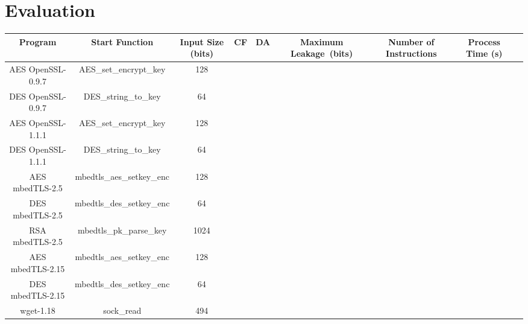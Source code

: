 \section{Evaluation}

\begin{table*}[h]
    \begin{tabular}{c c c c c c c c l}
    \hline
    Program                & Start Function             & Input Size (bits)   & CF   & DA     & Maximum Leakage (bits)& Number of Instructions & Process Time (s) \\ \hline
    AES OpenSSL-0.9.7      & AES\_set\_encrypt\_key     &     128             &      &        &                       &                        &                  \\
    DES OpenSSL-0.9.7      & DES\_string\_to\_key       &     64              &      &        &                       &                        &                  \\
    AES OpenSSL-1.1.1      & AES\_set\_encrypt\_key     &     128             &      &        &                       &                        &                  \\
    DES OpenSSL-1.1.1      & DES\_string\_to\_key       &     64              &      &        &                       &                        &                  \\
    AES mbedTLS-2.5        & mbedtls\_aes\_setkey\_enc	&     128             &      &        &                       &                        &                  \\
    DES mbedTLS-2.5        & mbedtls\_des\_setkey\_enc  &     64              &      &        &                       &                        &                  \\
    RSA mbedTLS-2.5        & mbedtls\_pk\_parse\_key    &     1024            &      &        &                       &                        &                  \\
    AES mbedTLS-2.15       & mbedtls\_aes\_setkey\_enc  &     128             &      &        &                       &                        &                  \\
    DES mbedTLS-2.15       & mbedtls\_des\_setkey\_enc  &     64              &      &        &                       &                        &                  \\
    wget-1.18              & sock\_read                 &     494             &      &        &                       &                        &                   \\
    \hline
    \end{tabular}
\end{table*}
